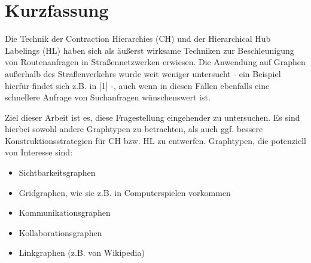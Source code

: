 \chapter*{Kurzfassung}
Die Technik der Contraction Hierarchies (CH) und der Hierarchical Hub Labelings (HL) haben sich als äußerst wirksame Techniken zur Beschleunigung von Routenanfragen in Straßennetzwerken erwiesen. Die Anwendung auf Graphen außerhalb des Straßenverkehrs wurde weit weniger untersucht - ein Beispiel hierfür findet sich z.B. in [1] -, auch wenn in diesen Fällen ebenfalls eine schnellere Anfrage von Suchanfragen wünschenswert ist.

Ziel dieser Arbeit ist es, diese Fragestellung eingehender zu untersuchen. Es sind hierbei sowohl andere Graphtypen zu betrachten, als auch ggf. bessere Konstruktionsstrategien für CH bzw. HL zu entwerfen. Graphtypen, die potenziell von Interesse sind:

\begin{itemize}
  \item
    Sichtbarkeitsgraphen
  \item
    Gridgraphen, wie sie z.B. in Computerspielen vorkommen
  \item
    Kommunikationsgraphen
  \item
    Kollaborationsgraphen
  \item
    Linkgraphen (z.B. von Wikipedia)
\end{itemize}
